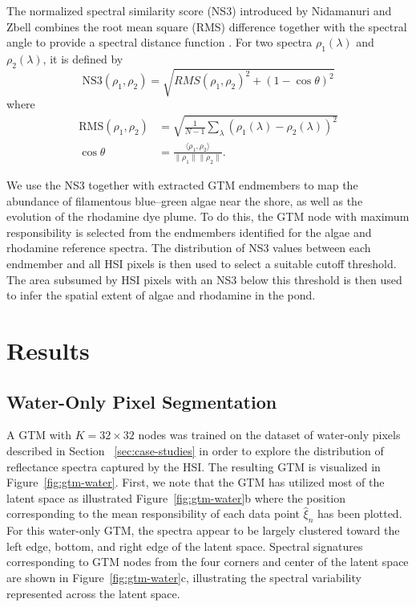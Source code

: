 The normalized spectral similarity score (NS3) introduced by Nidamanuri and Zbell combines the root mean square (RMS) difference together with the spectral angle to provide a spectral distance function \cite{nidamanuri2010normalized}. For two spectra $\rho_1(\lambda)$ and $\rho_2(\lambda)$, it is defined by
\begin{equation}
    \text{NS3}(\rho_1, \rho_2) = \sqrt{RMS(\rho_1, \rho_2)^2 + (1-\cos\theta)^2}
\end{equation}
where
\begin{align}
    \text{RMS}(\rho_1, \rho_2) &= \sqrt{\frac{1}{N-1}\sum_\lambda \left(\rho_{1}(\lambda) - \rho_2(\lambda) \right)^2} \\
    \cos\theta &= \frac{\langle \rho_1 , \rho_2 \rangle}{\lVert \rho_1\rVert \lVert \rho_2 \rVert}.
\end{align}

We use the NS3 together with extracted GTM endmembers to map the abundance of filamentous blue--green algae near the shore, as well as the evolution of the rhodamine dye plume. To do this, the GTM node with maximum responsibility is selected from the endmembers identified for the algae and rhodamine reference spectra. The distribution of NS3 values between each endmember and all HSI pixels is then used to select a suitable cutoff threshold. The area subsumed by HSI pixels with an NS3 below this threshold is then used to infer the spatial extent of algae and rhodamine in the pond. 




\section{Results}



\subsection{Water-Only Pixel Segmentation}


A GTM with $K=32\times 32$ nodes was trained on the dataset of water-only pixels described in Section ~\ref{sec:case-studies} in order to explore the distribution of reflectance spectra captured by the HSI. The resulting GTM is visualized in Figure~\ref{fig:gtm-water}. First, we note that the GTM has utilized most of the latent space as illustrated  Figure~\ref{fig:gtm-water}b where the position corresponding to the mean responsibility of each data point $\hat{\xi}_n$ has been plotted. For this water-only GTM, the spectra appear to be largely clustered toward the left edge, bottom, and right edge of the latent space. Spectral signatures corresponding to GTM nodes from the four corners and center of the latent space are shown in Figure~\ref{fig:gtm-water}c, illustrating the spectral variability represented across the latent space. 

